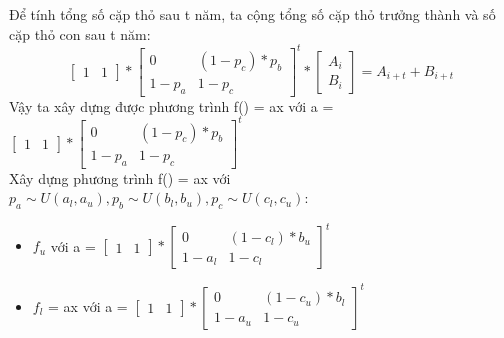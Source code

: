 \documentclass[a4paper,11pt]{article}
\theoremstyle{mytheor}
\begin{document}
Để tính tổng số cặp thỏ sau t năm, ta cộng tổng số cặp thỏ trưởng thành và số cặp thỏ con sau t năm:
$$
    \begin{bmatrix}1 & 1\end{bmatrix}*
    \begin{bmatrix}0&(1-p_c)*p_b\\ 1-p_a & 1-p_c \end{bmatrix}^t * \begin{bmatrix}A_i\\B_i\end{bmatrix} = A_{i+t}+B_{i+t}
$$
Vậy ta xây dựng được phương trình f() = ax với a = $\begin{bmatrix}1 & 1\end{bmatrix}* \begin{bmatrix}0&(1-p_c)*p_b\\ 1-p_a & 1-p_c \end{bmatrix}^t$\\
Xây dựng phương trình f() = ax với $p_a \sim U(a_l,a_u),p_b \sim U(b_l,b_u),p_c \sim U(c_l,c_u) $:
\begin{itemize}
    \item $f_u$ với a =  $\begin{bmatrix}1 & 1\end{bmatrix}* \begin{bmatrix}0&(1-c_l)*b_u\\ 1-a_l & 1-c_l \end{bmatrix}^t$
    \item $f_l$ = ax với a =  $\begin{bmatrix}1 & 1\end{bmatrix}* \begin{bmatrix}0&(1-c_u)*b_l\\ 1-a_u & 1-c_u \end{bmatrix}^t$
\end{itemize}
\end{document}
